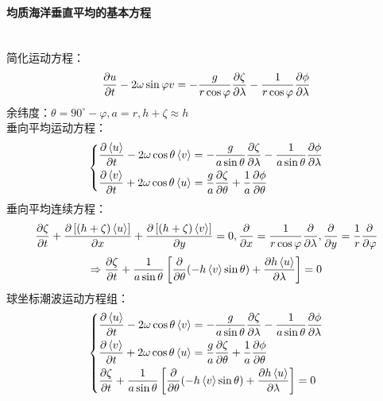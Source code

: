 \documentclass[a4paper,12pt]{article}
\begin{document}
    \paragraph{均质海洋垂直平均的基本方程}~{}\\
    简化运动方程：
    \[
        {{\partial u} \over {\partial t}} - 2\omega \sin \varphi v =  - {g \over {r\cos \varphi }}{{\partial \zeta } \over {\partial \lambda }} - {1 \over {r\cos \varphi }}{{\partial \phi } \over {\partial \lambda }}
    \]
    余纬度：$\theta=90^\circ-\varphi,a=r,h+\zeta\approx h$\\
    垂向平均运动方程：
    \[
        \left\{
        \begin{aligned}
            &{{\partial \left\langle u \right\rangle } \over {\partial t}} - 2\omega \cos \theta \left\langle v \right\rangle  =  - {g \over {a\sin \theta }}{{\partial \zeta } \over {\partial \lambda }} - {1 \over {a\sin \theta }}{{\partial \phi } \over {\partial \lambda }}\\
            &{{\partial \left\langle v \right\rangle } \over {\partial t}} + 2\omega \cos \theta \left\langle u \right\rangle  = {g \over a}{{\partial \zeta } \over {\partial \theta }} + {1 \over a}{{\partial \phi } \over {\partial \theta }}
        \end{aligned}
        \right.
    \]
    垂向平均连续方程：
    \[
        {{\partial \zeta } \over {\partial t}} + {{\partial \left[ {(h + \zeta )\left\langle u \right\rangle } \right]} \over {\partial x}} + {{\partial \left[ {(h + \zeta )\left\langle v \right\rangle } \right]} \over {\partial y}} = 0,{\partial  \over {\partial x}} = {1 \over {r\cos \varphi }}{\partial  \over {\partial \lambda }},{\partial  \over {\partial y}} = {1 \over r}{\partial  \over {\partial \varphi }}
    \]
    \[
        \Rightarrow {{\partial \zeta } \over {\partial t}} + {1 \over {a\sin \theta }}\left[ {{\partial  \over {\partial \theta }}( - h\left\langle v \right\rangle \sin \theta ) + {{\partial h\left\langle u \right\rangle } \over {\partial \lambda }}} \right] = 0
    \]
    球坐标潮波运动方程组：
    \[
        \left\{
            \begin{aligned}
                &{{\partial \left\langle u \right\rangle } \over {\partial t}} - 2\omega \cos \theta \left\langle v \right\rangle  =  - {g \over {a\sin \theta }}{{\partial \zeta } \over {\partial \lambda }} - {1 \over {a\sin \theta }}{{\partial \phi } \over {\partial \lambda }}\\
                &{{\partial \left\langle v \right\rangle } \over {\partial t}} + 2\omega \cos \theta \left\langle u \right\rangle  = {g \over a}{{\partial \zeta } \over {\partial \theta }} + {1 \over a}{{\partial \phi } \over {\partial \theta }}\\
                &{{\partial \zeta } \over {\partial t}} + {1 \over {a\sin \theta }}\left[ {{\partial  \over {\partial \theta }}( - h\left\langle v \right\rangle \sin \theta ) + {{\partial h\left\langle u \right\rangle } \over {\partial \lambda }}} \right] = 0
            \end{aligned}
        \right.
    \]
\end{document}
